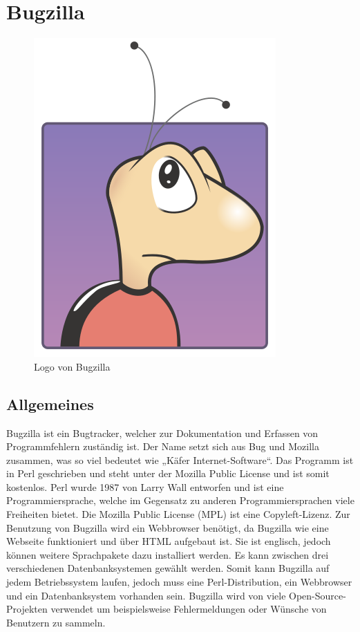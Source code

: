 \section{Bugzilla}
\begin{figure}[h]
  \centering
  \includegraphics[scale=0.5]{buggie.png}
  \caption{Logo von Bugzilla}
  \label{fig:bugzilla}
\end{figure}

\subsection{Allgemeines}
Bugzilla ist ein Bugtracker, welcher zur Dokumentation und Erfassen von Programmfehlern zuständig ist. Der Name setzt sich aus Bug und Mozilla zusammen, was so viel bedeutet wie „Käfer Internet-Software“.
Das Programm ist in Perl geschrieben und steht unter der Mozilla Public License und ist somit kostenlos.
Perl wurde 1987 von Larry Wall entworfen und ist eine Programmiersprache, welche im Gegensatz zu anderen Programmiersprachen viele Freiheiten bietet. 
Die Mozilla Public License (MPL) ist eine Copyleft-Lizenz.
Zur Benutzung von Bugzilla wird ein Webbrowser benötigt, da Bugzilla wie eine Webseite funktioniert und über HTML aufgebaut ist. Sie ist englisch, jedoch können weitere Sprachpakete dazu installiert werden. Es kann zwischen drei verschiedenen Datenbanksystemen gewählt werden.
Somit kann Bugzilla auf jedem Betriebssystem laufen, jedoch muss eine Perl-Distribution, ein Webbrowser und ein Datenbanksystem vorhanden sein.
Bugzilla wird von viele Open-Source-Projekten verwendet um beispielsweise Fehlermeldungen oder Wünsche von Benutzern zu sammeln. 

